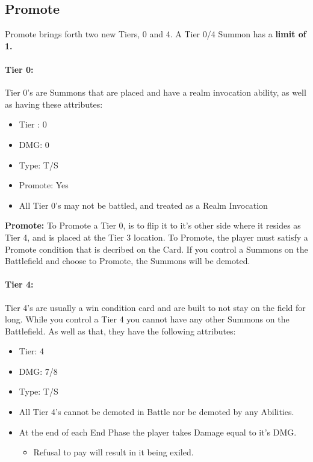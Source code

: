 \subsection{Promote}
Promote brings forth two new Tiers, 0 and 4. A Tier 0/4 Summon has a \textbf{limit of 1.}
\paragraph{Tier 0: \\}
Tier 0's are Summons that are placed and have a realm invocation ability, as well as having these attributes: 
\begin{itemize}
    \item Tier : 0
    \item DMG: 0
    \item Type: T/S
    \item Promote: Yes
    \item All Tier 0's may not be battled, and treated as a Realm Invocation
\end{itemize}
\textbf{Promote: } To Promote a Tier 0, is to flip it to it's other side where it resides as Tier 4, and 
is placed at the Tier 3 location. To Promote, the player must satisfy a Promote condition that is decribed on the Card. 
If you control a Summons on the Battlefield and choose to Promote, the Summons will be demoted.

\paragraph{Tier 4: \\}
Tier 4's are usually a win condition card and are built to not stay on the field for long. While you 
control a Tier 4 you cannot have any other Summons on the Battlefield. As well as that, they have the 
following attributes: 
\begin{itemize}
    \item Tier: 4
    \item DMG: 7/8
    \item Type: T/S
    \item All Tier 4's cannot be demoted in Battle nor be demoted by any Abilities. 
    \item At the end of each End Phase the player takes Damage equal to it's DMG. 
    \begin{itemize}
        \item Refusal to pay will result in it being exiled. 
    \end{itemize}
\end{itemize}
